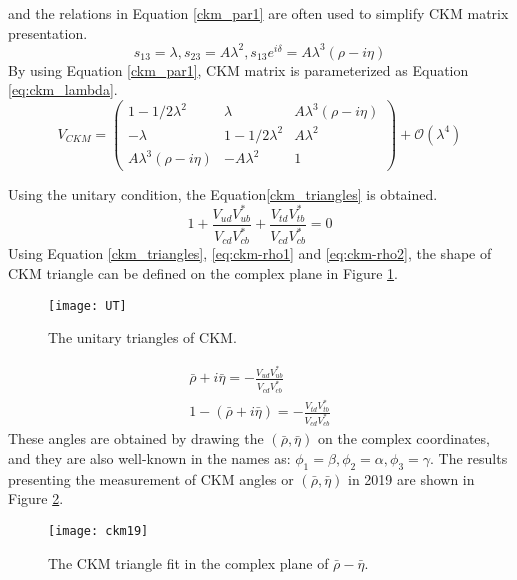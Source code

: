 and the relations in Equation \ref{ckm_par1} are often used to simplify CKM matrix presentation.
\begin{equation}\label{ckm_par1}
s_{13}=\lambda , s_{23}=A\lambda^2, s_{13}e^{i\delta}=A\lambda^3(\rho-i\eta)
\end{equation}
By using Equation \ref{ckm_par1}, CKM matrix is parameterized as Equation \ref{eq:ckm_lambda}.
\begin{equation}\label{eq:ckm_lambda}
V_{CKM}=
\begin{pmatrix}
1-1/2\lambda^2 & \lambda & A\lambda^3(\rho-i\eta)\\
-\lambda & 1-1/2\lambda^2 & A\lambda^2\\
A\lambda^3(\rho-i\eta) & -A\lambda^2 & 1
\end{pmatrix}+\mathcal{O}(\lambda^4)
\end{equation}

Using the unitary condition, the Equation\ref{ckm_triangles} is obtained.
\begin{equation}\label{ckm_triangles}
1+
\frac{V_{ud}V^*_{ub}}{V_{cd}V^*_{cb}}+
\frac{V_{td}V^*_{tb}}{V_{cd}V^*_{cb}}
=0
\end{equation}
Using Equation \ref{ckm_triangles}, \ref{eq:ckm-rho1} and \ref{eq:ckm-rho2}, the shape of CKM triangle can be defined on the complex plane in Figure \ref{fig:ckm_angles}.
\begin{figure}[htpb]
	\centering
	\texttt{[image: UT]}
	\caption{The unitary triangles of CKM\cite{ckmfitter}.}
	\label{fig:ckm_angles}
\end{figure}
\begin{eqnarray}
\bar{\rho}+i\bar{\eta}=- \frac{V_{ud}V^*_{ub}}{V_{cd}V^*_{cb}}\label{eq:ckm-rho1}\\
1-(\bar{\rho}+i\bar{\eta})=-\frac{V_{td}V^*_{tb}}{V_{cd}V^*_{cb}}\label{eq:ckm-rho2}
\end{eqnarray}
These angles are obtained by drawing the $(\bar{\rho},\bar{\eta})$ on the complex coordinates, and they are also well-known in the names as: $\phi_1=\beta,\phi_2=\alpha,\phi_3=\gamma$. The results presenting the measurement of CKM angles or $(\bar{\rho},\bar{\eta})$ in 2019 are shown in Figure \ref{fig:ckm19}.
\begin{figure}[htbp]
	\centering
	\texttt{[image: ckm19]}
	\caption{The CKM triangle fit in the complex plane of $\bar{\rho}-\bar{\eta}$.\cite{ckmfitter}}
	\label{fig:ckm19}
\end{figure}

